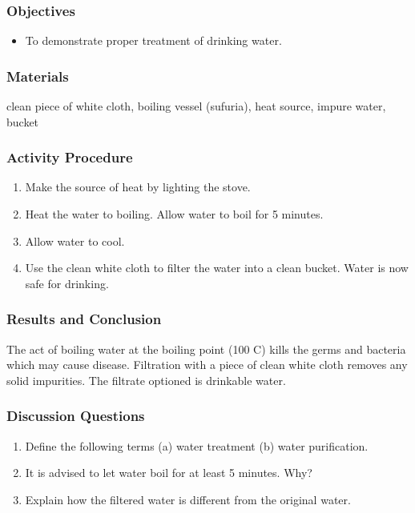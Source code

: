 \subsubsection*{Objectives}
\begin{itemize}
\item{To demonstrate proper treatment of drinking water.}
\end{itemize}

\subsubsection*{Materials}
clean piece of white cloth, boiling vessel (sufuria), heat source, impure water, bucket

\subsubsection*{Activity Procedure}
\begin{enumerate}
\item{Make the source of heat by lighting the stove.}
\item{Heat the water to boiling. Allow water to boil for 5 minutes.}
\item{Allow water to cool.}
\item{Use the clean white cloth to filter the water into a clean bucket. Water is now safe for drinking.}
\end{enumerate}

\subsubsection*{Results and Conclusion}
The act of boiling water at the boiling point (100 C) kills the germs and bacteria which may cause disease. Filtration with a piece of clean white cloth removes any solid impurities. The filtrate optioned is drinkable water.

\subsubsection*{Discussion Questions}
\begin{enumerate}
\item{Define the following terms (a) water treatment (b) water purification.}
\item{It is advised to let water boil for at least 5 minutes. Why?}
\item{Explain how the filtered water is different from the original water.}
\end{enumerate}

